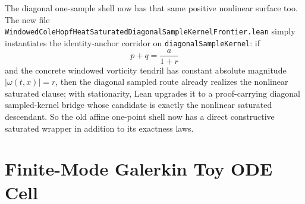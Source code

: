 \documentclass[11pt]{article}
\begin{document}
The diagonal one-sample shell now has that same positive nonlinear surface too.
The new file
\texttt{WindowedColeHopfHeatSaturatedDiagonalSampleKernelFrontier.lean}
simply instantiates the identity-anchor corridor on
\texttt{diagonalSampleKernel}: if
\[
  p + q = \frac{a}{1+r}
\]
and the concrete windowed vorticity tendril has constant absolute magnitude
\(|\omega(t,x)| = r\), then the diagonal sampled route already realizes the
nonlinear saturated clause; with stationarity, Lean upgrades it to a
proof-carrying diagonal sampled-kernel bridge whose candidate is exactly the
nonlinear saturated descendant.  So the old affine one-point shell now has a
direct constructive saturated wrapper in addition to its exactness laws.

\section{Finite-Mode Galerkin Toy ODE Cell}
\end{document}
